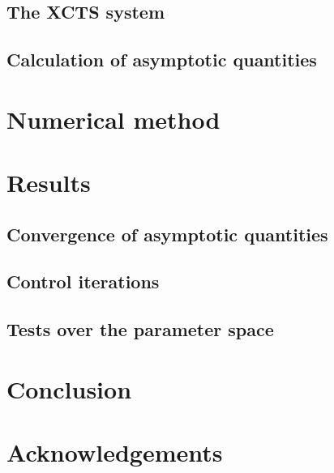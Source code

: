 \documentclass{../document}
\begin{document}
    \subsection{The XCTS system}

    \subsection{Calculation of asymptotic quantities}

  \section{Numerical method}
  
  \section{Results}

    \subsection{Convergence of asymptotic quantities}

    \subsection{Control iterations}

    \subsection{Tests over the parameter space}

  \section{Conclusion}

  \section*{Acknowledgements}
\end{document}
